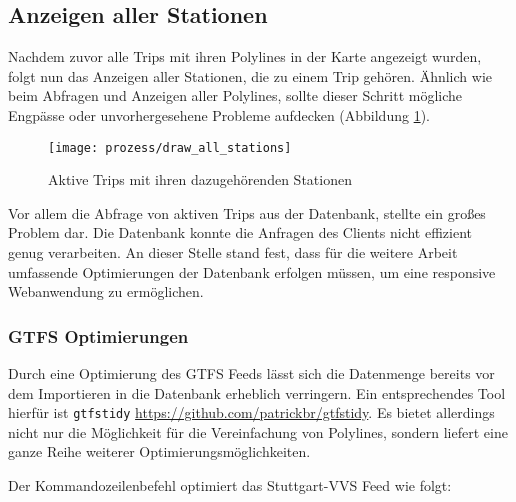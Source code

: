 \subsection{Anzeigen aller Stationen}
\label{sub:anzeigen_aller_stationen}
  Nachdem zuvor alle Trips mit ihren Polylines in der Karte angezeigt wurden, folgt nun das Anzeigen aller Stationen, die zu einem Trip gehören. Ähnlich wie beim Abfragen und Anzeigen aller Polylines, sollte dieser Schritt mögliche Engpässe oder unvorhergesehene Probleme aufdecken (Abbildung \ref{fig:prozess/draw_all_stations}).

  \begin{figure}[htbp]
     \begin{center}
       \texttt{[image: prozess/draw\_all\_stations]}
       \caption{Aktive Trips mit ihren dazugehörenden Stationen}
       \label{fig:prozess/draw_all_stations}
     \end{center}
   \end{figure}
   
  Vor allem die Abfrage von aktiven Trips aus der Datenbank, stellte ein großes Problem dar. Die Datenbank konnte die Anfragen des Clients nicht effizient genug verarbeiten. An dieser Stelle stand fest, dass für die weitere Arbeit umfassende Optimierungen der Datenbank erfolgen müssen, um eine responsive Webanwendung zu ermöglichen. 

  \subsubsection{GTFS Optimierungen}
  \label{ssub:gtfs_optimierungen}
    Durch eine Optimierung des GTFS Feeds lässt sich die Datenmenge bereits vor dem Importieren in die Datenbank erheblich verringern. Ein entsprechendes Tool hierfür ist \texttt{gtfstidy} \url{https://github.com/patrickbr/gtfstidy}. Es bietet allerdings nicht nur die Möglichkeit für die Vereinfachung von Polylines, sondern liefert eine ganze Reihe weiterer Optimierungsmöglichkeiten. 

    Der Kommandozeilenbefehl \colorbox{materialGrey}{\texttt{\color{white}{\$ gtfstidy -sSiRDeO input.zip output}}} optimiert das Stuttgart-VVS Feed wie folgt:
    
